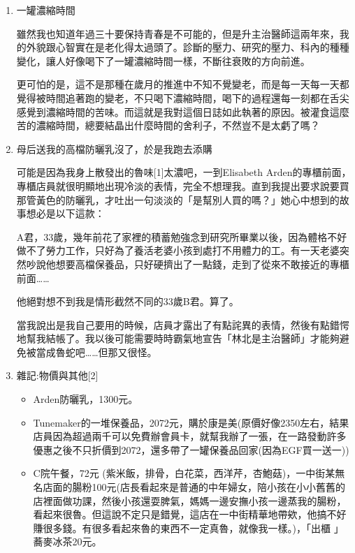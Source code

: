 \documentclass[
]{article}
\providecommand{\tightlist}{%
  \setlength{\itemsep}{0pt}\setlength{\parskip}{0pt}}
\begin{document}
\begin{enumerate}
\def\labelenumi{\arabic{enumi}.}
\item
  一罐濃縮時間

  雖然我也知道年過三十要保持青春是不可能的，但是升主治醫師這兩年來，我的外貌跟心智實在是老化得太過頭了。診斷的壓力、研究的壓力、科內的種種變化，讓人好像喝下了一罐濃縮時間一樣，不斷往衰敗的方向前進。

  更可怕的是，這不是那種在歲月的推進中不知不覺變老，而是每一天每一天都覺得被時間追著跑的變老，不只喝下濃縮時間，喝下的過程還每一刻都在舌尖感覺到濃縮時間的苦味。而這就是我對這個日誌如此執著的原因。被灌食這麼苦的濃縮時間，總要結晶出什麼時間的舍利子，不然豈不是太虧了嗎？
\item
  母后送我的高檔防曬乳沒了，於是我跑去添購

  可能是因為我身上散發出的魯味{[}1{]}太濃吧，一到Elisabeth
  Arden的專櫃前面，專櫃店員就很明顯地出現冷淡的表情，完全不想理我。直到我提出要求說要買那管黃色的防曬乳，才吐出一句淡淡的「是幫別人買的嗎？」她心中想到的故事想必是以下這款：

  A君，33歲，幾年前花了家裡的積蓄勉強念到研究所畢業以後，因為體格不好做不了勞力工作，只好為了養活老婆小孩到處打不用體力的工。有一天老婆突然吵說他想要高檔保養品，只好硬擠出了一點錢，走到了從來不敢接近的專櫃前面\ldots\ldots{}

  他絕對想不到我是情形截然不同的33歲B君。算了。

  當我說出是我自己要用的時候，店員才露出了有點詫異的表情，然後有點錯愕地幫我結帳了。我以後可能需要時時霸氣地宣告「林北是主治醫師」才能夠避免被當成魯蛇吧\ldots\ldots 但那又很怪。
\item
  雜記:物價與其他{[}2{]}

  \begin{itemize}
  \tightlist
  \item
    Arden防曬乳，1300元。
  \item
    Tunemaker的一堆保養品，2072元，購於康是美(原價好像2350左右，結果店員因為超過兩千可以免費辦會員卡，就幫我辦了一張，在一路發動許多優惠之後不只折價到2072，還多帶了一罐保養品回家(因為EGF買一送一))
  \item
    C院午餐，72元
    (紫米飯，排骨，白花菜，西洋芹，杏鮑菇)，一中街某無名店面的腸粉100元(店長看起來是普通的中年婦女，陪小孩在小小舊舊的店裡面做功課，然後小孩還耍脾氣，媽媽一邊安撫小孩一邊蒸我的腸粉，看起來很魯。但這說不定只是錯覺，這店在一中街精華地帶欸，他搞不好賺很多錢。有很多看起來魯的東西不一定真魯，就像我一樣。)，「出櫃
    」蕎麥冰茶20元。
  \end{itemize}
\end{enumerate}
\end{document}
